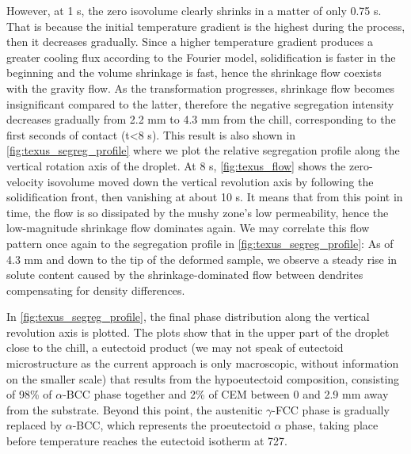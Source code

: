 However, at 1 s, the zero isovolume clearly shrinks in a matter of only 0.75 s. That is
because the initial temperature gradient is the highest during the process, then it decreases gradually. 
Since a higher temperature gradient produces a greater cooling flux according to the Fourier model, solidification is faster
in the beginning and the volume shrinkage is fast, hence the shrinkage flow coexists with the gravity flow. As the transformation
progresses, shrinkage flow becomes insignificant compared to the latter, therefore the negative segregation intensity decreases gradually from 2.2 mm
to 4.3 mm from the chill, corresponding to the first seconds of contact (t<8 s).
This result is also shown in \cref{fig:texus_segreg_profile} where we plot the relative segregation profile along the vertical rotation axis of the droplet.
At 8 s, \cref{fig:texus_flow} shows the zero-velocity isovolume moved down the vertical revolution axis by following
the solidification front, then vanishing at about 10 s. It means that from this point in time, the flow is so dissipated by the mushy zone's low permeability,
hence the low-magnitude shrinkage flow dominates again.
We may correlate this flow pattern once again to the segregation profile in \cref{fig:texus_segreg_profile}:
As of 4.3 mm and down to the tip of the deformed sample, we observe a steady rise in solute content caused 
by the shrinkage-dominated flow between dendrites compensating for density differences. 

In \cref{fig:texus_segreg_profile}, the final phase distribution along the vertical revolution axis is plotted.
The plots show that in the upper part of the droplet close to the chill, a eutectoid product (we may not speak of eutectoid microstructure as the current approach is only macroscopic, without
information on the smaller scale) that results from the hypoeutectoid composition, consisting of 98\% of $\alpha$-BCC phase together and 2\% of CEM between 0 and 2.9 mm away from the substrate.
Beyond this point, the austenitic $\gamma$-FCC phase is gradually replaced by $\alpha$-BCC, which represents the proeutectoid $\alpha$ phase, taking place before temperature
reaches the eutectoid isotherm at \SI{727}{\udegC}.


